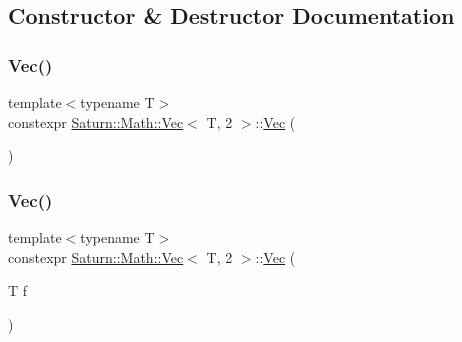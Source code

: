 \subsection{Constructor \& Destructor Documentation}
\mbox{\label{class_saturn_1_1_math_1_1_vec_3_01_t_00_012_01_4_a4106453ff907cd5148e71d0ab0d82337}} 
\subsubsection{\texorpdfstring{Vec()}{Vec()}\hspace{0.1cm}{\footnotesize\ttfamily [1/4]}}
{\footnotesize\ttfamily template$<$typename T$>$ \\
constexpr \mbox{\hyperlink{class_saturn_1_1_math_1_1_vec}{Saturn\+::\+Math\+::\+Vec}}$<$ T, 2 $>$\+::\mbox{\hyperlink{class_saturn_1_1_math_1_1_vec}{Vec}} (\begin{DoxyParamCaption}{ }\end{DoxyParamCaption})\hspace{0.3cm}{\ttfamily [inline]}}

\mbox{\label{class_saturn_1_1_math_1_1_vec_3_01_t_00_012_01_4_a28efe1b6694815ce1773f1981f228ebe}} 
\subsubsection{\texorpdfstring{Vec()}{Vec()}\hspace{0.1cm}{\footnotesize\ttfamily [2/4]}}
{\footnotesize\ttfamily template$<$typename T$>$ \\
constexpr \mbox{\hyperlink{class_saturn_1_1_math_1_1_vec}{Saturn\+::\+Math\+::\+Vec}}$<$ T, 2 $>$\+::\mbox{\hyperlink{class_saturn_1_1_math_1_1_vec}{Vec}} (\begin{DoxyParamCaption}\item[{T}]{f }\end{DoxyParamCaption})\hspace{0.3cm}{\ttfamily [inline]}}

